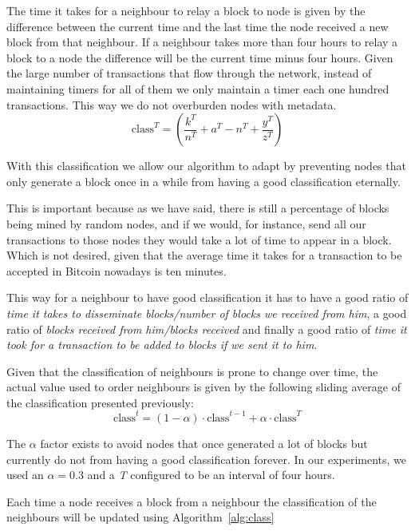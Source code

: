 \documentclass{dads}   %
\begin{document}
The time it takes for a neighbour to relay a block to node is given by the difference between the current time and the last time the node received a new block from that neighbour. If a neighbour takes more than four hours to relay a block to a node the difference will be the current time minus four hours. Given the large number of transactions that flow through the network, instead of maintaining timers for all of them we only maintain a timer each one hundred transactions. This way we do not overburden nodes with metadata.
\begin{displaymath} \mbox{class}^{T}= (\dfrac{k^{T}}{n^{T}} + a^{T} - n^{T} + \dfrac{y^{T}}{z^{T}}) \end{displaymath}

With this classification we allow our algorithm to adapt by preventing nodes that only generate a block once in a while from having a good classification eternally.

This is important because as we have said, there is still a percentage of blocks being mined by random nodes, and if we would, for instance, send all our transactions to those nodes they would take a lot of time to appear in a block. Which is not desired, given that the average time it takes for a transaction to be accepted in Bitcoin nowadays is ten minutes.

This way for a neighbour to have good classification it has to have a good ratio of \textsl{time it takes to disseminate blocks/number of blocks we received from him}, a good ratio of \textsl{blocks received from him/blocks received} and finally a good ratio of \textsl{time it took for a transaction to be added to blocks if we sent it to him}.

Given that the classification of neighbours is prone to change over time, the actual value used to order neighbours is given by the following sliding average of the classification presented previously:
\begin{displaymath} \mbox{class}^t = (1-\alpha) \cdot \mbox{class}^{t-1} + \alpha \cdot \mbox{class}^{T} \end{displaymath}

The $\alpha$ factor exists to avoid nodes that once generated a lot of blocks but currently do not from having a good classification forever. In our experiments, we used an $\alpha=0.3$ and a \textit{T} configured to be an interval of four hours.

Each time a node receives a block from a neighbour the classification of the neighbours will be updated using Algorithm~\ref{alg:class}
\end{document}
